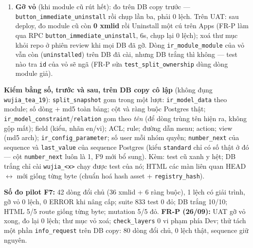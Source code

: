 \begin{enumerate}
  riêng), \texttt{sel} (giá trị selection), \texttt{cron}/\texttt{tpl}/\texttt{srv},
  \texttt{attach}, rule theo module --- F7 không gặp vì model không kế thừa mixin, F8 gặp ngay
  (\texttt{info\_request}: 2 inherit + 14 selection). Route controller không nằm trong DB: kiểm
  bằng \texttt{controller\_inventory.py}.
\item \textbf{Gỡ vỏ} (khi module cũ rút hết): đo trên DB copy trước --- \texttt{button\_immediate\_uninstall}
  rồi chụp lần ba, phải 0 lệch. Trên UAT: sau deploy, đo module cũ còn \textbf{0 xmlid} rồi
  Uninstall một cú trên Apps (FR-P làm qua RPC \texttt{button\_immediate\_uninstall}, 6s, chụp
  lại 0 lệch); xoá thư mục khỏi repo ở phiên review khi mọi DB đã gỡ. Dòng
  \texttt{ir\_module\_module} của vỏ vẫn còn (\texttt{uninstalled}) trên DB đã cài, nhưng DB trắng
  thì không --- test nào tra \texttt{id} của vỏ sẽ ngã (FR-P sửa \texttt{test\_split\_ownership}
  dùng dòng module giả).
\end{enumerate}

\textbf{Kiểm bằng số, trước và sau, trên DB copy cô lập} (không đụng \texttt{wujia\_tea\_19}):
\texttt{split\_snapshot} gom trong một lượt: \texttt{ir\_model\_data} theo module; số dòng + md5
toàn bảng; cột và ràng buộc Postgres thật; \texttt{ir\_model\_constraint}/\texttt{relation} gom
theo \emph{tên} (để dòng trùng tên hiện ra, không gộp mất); field (kiểu, nhãn en/vi); ACL; rule;
đường dẫn menu; action; view (md5 arch); \texttt{ir\_config\_parameter}; số user mỗi nhóm quyền;
\texttt{number\_next} của sequence và \texttt{last\_value} của sequence Postgres (kiểu
\texttt{standard} chỉ có số thật ở đó --- cột \texttt{number\_next} luôn là 1, F9 mới bổ sung). Kèm: test cũ xanh y hệt; DB trắng chỉ cài \texttt{wujia\_<x>}
chạy được test của nó; HTML các màn liên quan HEAD $\leftrightarrow$ mới giống từng byte (chuẩn
hoá hash asset + \texttt{registry\_hash}).

\textbf{Số đo pilot F7:} 42 dòng đổi chủ (36 xmlid + 6 ràng buộc), 1 lệch có giải trình, gỡ vỏ
0 lệch, 0 ERROR khi nâng cấp; suite 833 test 0 đỏ; DB trắng 10/10; HTML 5/5 route giống từng
byte; mutation 5/5 đỏ. \textbf{FR-P (26/09):} UAT gỡ vỏ xong, đo lại 0 lệch; thư mục vỏ xoá;
\texttt{check\_layers} 0 vi phạm phía Dev; thử tách một phần \texttt{info\_request} trên DB copy:
80 dòng đổi chủ, 0 lệch thật, sequence giữ nguyên.

